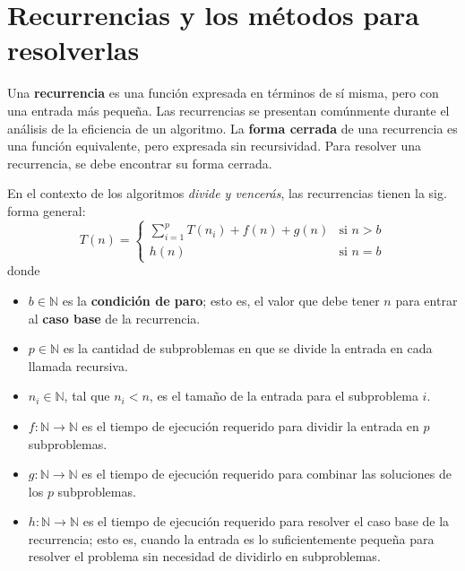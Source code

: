 \chapter{Recurrencias y los métodos para resolverlas}

Una \textbf{recurrencia} es una función expresada en términos de sí misma, pero con una entrada más pequeña. 
Las recurrencias se presentan comúnmente durante el análisis de la eficiencia de un algoritmo. 
La \textbf{forma cerrada} de una recurrencia es una función equivalente, pero expresada sin recursividad. 
Para resolver una recurrencia, se debe encontrar su forma cerrada.


En el contexto de los algoritmos \emph{divide y vencerás}, las recurrencias tienen la sig. forma general: 
\[
  T(n)=\begin{cases}
    \sum_{i=1}^pT(n_i)+f(n)+g(n) & \text{si }n>b\\
    h(n) & \text{si } n=b
  \end{cases}
\]
donde

\begin{itemize}
  \item \(b\in\mathbb{N}\) es la \textbf{condición de paro}; esto es, el valor que debe tener \(n\) para entrar al \textbf{caso base} de la recurrencia.
  \item \(p\in\mathbb{N}\) es la cantidad de subproblemas en que se divide la entrada en cada llamada recursiva.
  \item \(n_i\in\mathbb{N}\), tal que \(n_i<n\), es el tamaño de la entrada
  para el subproblema \(i\).
  \item \(f:\mathbb{N}\to\mathbb{N}\) es el tiempo de ejecución requerido para dividir la entrada en \(p\) subproblemas.
  \item \(g:\mathbb{N}\to\mathbb{N}\) es el tiempo de ejecución requerido para combinar las soluciones de los \(p\) subproblemas.
  \item \(h:\mathbb{N}\to\mathbb{N}\) es el tiempo de ejecución requerido para resolver el caso base de la recurrencia; esto es, cuando la entrada es lo suficientemente pequeña para resolver el problema sin necesidad de dividirlo en subproblemas. 
\end{itemize}

